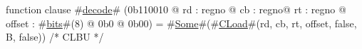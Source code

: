 function clause #\hyperref[zdecode]{decode}# (0b110010 @ rd : regno @ cb : regno@ rt : regno @ offset : #\hyperref[zbits]{bits}#(8) @ 0b0 @ 0b00) = #\hyperref[zSome]{Some}#(#\hyperref[zCLoad]{CLoad}#(rd, cb, rt, offset, false, B, false)) /* CLBU */
